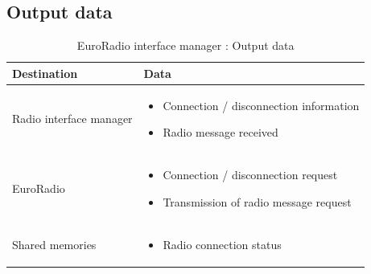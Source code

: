 \documentclass[nocc]{template/openetcs_report}
\begin{document}
\subsection{Output data}
			\begin{longtable}{|l|l|}
				\caption{EuroRadio interface manager : Output data}\\ 
				\hline
				
					\begin{minipage}[t]{0.35\linewidth} \textbf{Destination}	\end{minipage} 
				&	\begin{minipage}[t]{0.65\linewidth} \textbf{Data} \end{minipage} \\
				
				\hline
																																									
					\begin{minipage}[t]{0.35\linewidth} Radio interface manager	\end{minipage} 
				&	\begin{minipage}[t]{0.65\linewidth}
						\begin{itemize}
							\item Connection / disconnection information
							\item Radio message received
						\end{itemize}
					\end{minipage} \\
				
				\hline
				
					\begin{minipage}[t]{0.35\linewidth} EuroRadio	\end{minipage} 
				&	\begin{minipage}[t]{0.65\linewidth}
						\begin{itemize}
							\item Connection / disconnection request
							\item Transmission of radio message request
						\end{itemize}			
					\end{minipage} \\
				
				\hline	
				
					\begin{minipage}[t]{0.35\linewidth} Shared memories	\end{minipage} 
				&	\begin{minipage}[t]{0.65\linewidth}
						\begin{itemize}
							\item Radio connection status
						\end{itemize}				
					\end{minipage} \\
				
				\hline	
			\end{longtable}
\newpage				
\end{document}
